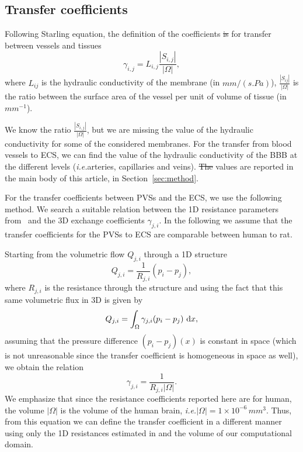 \documentclass[10pt]{article}
\newcommand{\ie}{\emph{i.e.}\;}
\newcommand{\1}{^{(1)}}
\newcommand{\2}{^{(2)}}
\newcommand*{\dd}{\mathop{\kern0pt\mathrm{d}}\!{}}
\newcommand{\abs}[1]{\left\lvert#1\right\rvert}
\providecommand{\DIFaddtex}[1]{{\protect\color{blue}\uwave{#1}}} %
\providecommand{\DIFdeltex}[1]{{\protect\color{red}\sout{#1}}}                      %
\providecommand{\DIFaddbegin}{} %
\providecommand{\DIFaddend}{} %
\providecommand{\DIFdelbegin}{} %
\providecommand{\DIFdelend}{} %
\providecommand{\DIFadd}[1]{\texorpdfstring{\DIFaddtex{#1}}{#1}} %
\providecommand{\DIFdel}[1]{\texorpdfstring{\DIFdeltex{#1}}{}} %
\newcommand{\DIFscaledelfig}{0.5}
\newlength{\DIFdelgraphicswidth} %
\newlength{\DIFdelgraphicsheight} %
\newcommand{\DIFaddincludegraphics}[2][]{{\color{blue}\fbox{\DIFOincludegraphics[#1]{#2}}}} %
\newcommand{\DIFdelincludegraphics}[2][]{%
\sbox{\DIFdelgraphicsbox}{\DIFOincludegraphics[#1]{#2}}%
\settoboxwidth{\DIFdelgraphicswidth}{\DIFdelgraphicsbox} %
\settoboxtotalheight{\DIFdelgraphicsheight}{\DIFdelgraphicsbox} %
\scalebox{\DIFscaledelfig}{%
\parbox[b]{\DIFdelgraphicswidth}{\usebox{\DIFdelgraphicsbox}\\[-\baselineskip] \rule{\DIFdelgraphicswidth}{0em}}\llap{\resizebox{\DIFdelgraphicswidth}{\DIFdelgraphicsheight}{%
\setlength{\unitlength}{\DIFdelgraphicswidth}%
\begin{picture}(1,1)%
\thicklines\linethickness{2pt} %
{\color[rgb]{1,0,0}\put(0,0){\framebox(1,1){}}}%
{\color[rgb]{1,0,0}\put(0,0){\line( 1,1){1}}}%
{\color[rgb]{1,0,0}\put(0,1){\line(1,-1){1}}}%
\end{picture}%
}\hspace*{3pt}}} %
} %
\DeclareRobustCommand{\DIFaddbegin}{\DIFOaddbegin \let\includegraphics\DIFaddincludegraphics} %
\DeclareRobustCommand{\DIFaddend}{\DIFOaddend \let\includegraphics\DIFOincludegraphics} %
\DeclareRobustCommand{\DIFdelbegin}{\DIFOdelbegin \let\includegraphics\DIFdelincludegraphics} %
\DeclareRobustCommand{\DIFdelend}{\DIFOaddend \let\includegraphics\DIFOincludegraphics} %
\begin{document}
\subsection{Transfer coefficients}




Following Starling equation, the definition of the coefficients \DIFdelbegin \DIFdel{is }\DIFdelend for transfer between vessels and tissues \DIFaddbegin \DIFadd{is
}\DIFaddend \begin{equation}
    \gamma_{i, j} = L_{i,j} \frac{\abs{S_{i,j}}}{\abs{\Omega}}, 
    \label{eq:mass-transfer-convect}
\end{equation}
where \DIFdelbegin \DIFdel{$L_{ij}$ }\DIFdelend \DIFaddbegin \DIFadd{$L_{i,j}$ }\DIFaddend is the hydraulic conductivity of the membrane (in $\si{mm /(s. Pa)}$), \DIFdelbegin \DIFdel{$\frac{\abs{S_{ij}}}{\abs{\Omega}}$ }\DIFdelend \DIFaddbegin \DIFadd{$\frac{\abs{S_{i,j}}}{\abs{\Omega}}$ }\DIFaddend is the ratio between the surface area of the vessel per unit of volume of tissue (in $\si{mm^{-1}}$). 

We know the ratio $\frac{\abs{S_{i,j}}}{\abs{\Omega}}$, but we are missing the value of the hydraulic conductivity for some of the considered membranes. For the transfer from blood vessels to ECS, we can find the value of the hydraulic conductivity of the BBB at the different levels (\ie arteries, capillaries and veins). \DIFdelbegin \DIFdel{The }\DIFdelend \DIFaddbegin \DIFadd{These }\DIFaddend values are reported in the main body of this article, in Section~\ref{sec:method}.

For the transfer coefficients between PVSs and the ECS, we use the following method. We search a suitable relation between the 1D resistance parameters from~\cite{Vinje-2020-ICP} and the 3D exchange coefficients $\gamma_{j, i}$. 
In the following we assume that the transfer coefficients for the PVSs to ECS are comparable between human to rat.

Starting from the volumetric flow $Q_{j, i}$ through a 1D structure 
\[
    Q_{j, i} = \frac{1}{R_{j, i}}(p_i-p_j),
\]
where $R_{j, i}$ is the resistance through the structure and using the fact that this same volumetric flux in 3D is given by 
\[
    Q_{j, i} = \int_\Omega \gamma_{j , i}(p_i-p_j)\, \dd x,
\]
assuming that the pressure difference $(p_i-p_j)(x)$ is constant in space (which is not unreasonable since the transfer coefficient is homogeneous in space as well), we obtain the relation 
\[
    \gamma_{j , i } = \frac{1}{R_{j , i } \abs{\Omega}}.
\]
We emphasize that since the resistance coefficients reported here are for human, the volume $\abs{\Omega}$ is the volume of the human brain, \ie $\abs{\Omega} = 1\times 10^{-6}\, \si{mm^3}$. 
Thus, from this equation we can define the transfer coefficient in a different manner using only the 1D resistances estimated in \cite{Vinje-2020-ICP} and the volume of our computational domain.  
\end{document}
